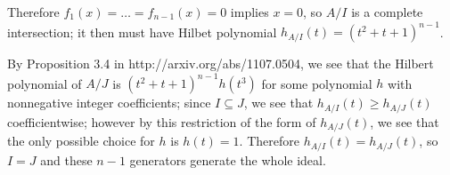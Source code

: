 \documentclass{article}
\numberwithin{equation}{section}
\begin{document}
Therefore $f_1(x) = \dots = f_{n-1}(x)=0$ implies $x=0$, so $A/I$ is a complete intersection; it then must have Hilbet polynomial $h_{A/I}(t)=(t^2+t+1)^{n-1}$. 

By Proposition 3.4 in http://arxiv.org/abs/1107.0504, we see that the Hilbert polynomial of $A/J$ is $(t^2+t+1)^{n-1}h(t^3)$ for some polynomial $h$ with nonnegative integer coefficients; since $I \subseteq J$, we see that $h_{A/I}(t) \ge h_{A/J}(t)$ coefficientwise; however by this restriction of the form of $h_{A/J}(t)$, we see that the only possible choice for $h$ is $h(t)=1$. Therefore $h_{A/I}(t)=h_{A/J}(t)$, so $I=J$ and these $n-1$ generators generate the whole ideal.
\end{document}

